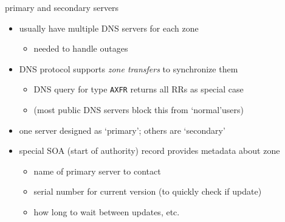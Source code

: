 \begin{frame}{primary and secondary servers}
\begin{itemize}
\item usually have multiple DNS servers for each zone
    \begin{itemize}
    \item needed to handle outages
    \end{itemize}
\item DNS protocol supports \textit{zone transfers} to synchronize them
    \begin{itemize}
    \item DNS query for type \texttt{AXFR} returns all RRs as special case
    \item (most public DNS servers block this from `normal'users)
    \end{itemize}
\item one server designed as `primary'; others are `secondary'
\item special SOA (start of authority) record provides metadata about zone
    \begin{itemize}
    \item name of primary server to contact
    \item serial number for current version (to quickly check if update)
    \item how long to wait between updates, etc.
    \end{itemize}
\end{itemize}
\end{frame}
